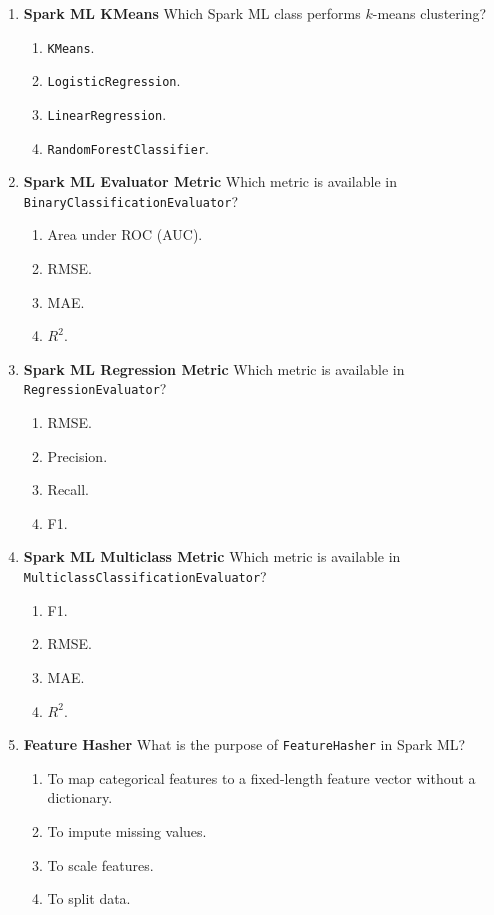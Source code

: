 \documentclass{article}
\begin{document}
\begin{enumerate}[label=\textbf{Q\arabic*.}]
		\item \textbf{Spark ML KMeans}
		Which Spark ML class performs $k$-means clustering?
		\begin{enumerate}[label=\Alph*.]
			\item \texttt{KMeans}.
			\item \texttt{LogisticRegression}.
			\item \texttt{LinearRegression}.
			\item \texttt{RandomForestClassifier}.
		\end{enumerate}
		
		\item \textbf{Spark ML Evaluator Metric}
		Which metric is available in \texttt{BinaryClassificationEvaluator}?
		\begin{enumerate}[label=\Alph*.]
			\item Area under ROC (AUC).
			\item RMSE.
			\item MAE.
			\item $R^2$.
		\end{enumerate}
		
		\item \textbf{Spark ML Regression Metric}
		Which metric is available in \texttt{RegressionEvaluator}?
		\begin{enumerate}[label=\Alph*.]
			\item RMSE.
			\item Precision.
			\item Recall.
			\item F1.
		\end{enumerate}
		
		\item \textbf{Spark ML Multiclass Metric}
		Which metric is available in \texttt{MulticlassClassificationEvaluator}?
		\begin{enumerate}[label=\Alph*.]
			\item F1.
			\item RMSE.
			\item MAE.
			\item $R^2$.
		\end{enumerate}
		
		\item \textbf{Feature Hasher}
		What is the purpose of \texttt{FeatureHasher} in Spark ML?
		\begin{enumerate}[label=\Alph*.]
			\item To map categorical features to a fixed-length feature vector without a dictionary.
			\item To impute missing values.
			\item To scale features.
			\item To split data.
		\end{enumerate}
		

\end{enumerate}
\end{document}
